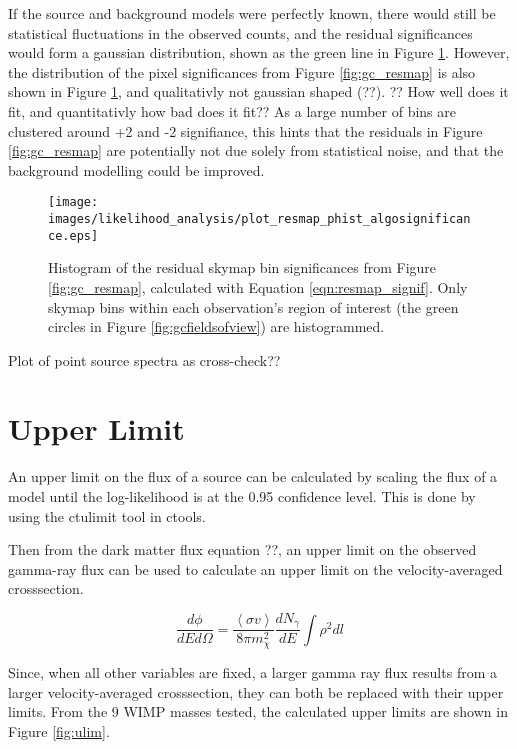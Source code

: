   If the source and background models were perfectly known, there would still be statistical fluctuations in the observed counts, and the residual significances would form a gaussian distribution, shown as the green line in Figure \ref{fig:gc_resmap_sighist}.
  However, the distribution of the pixel significances from Figure \ref{fig:gc_resmap} is also shown in Figure \ref{fig:gc_resmap_sighist}, and qualitativly not gaussian shaped {\color{red}(??)}.
  {\color{red}?? How well does it fit, and quantitativly how bad does it fit??}
  As a large number of bins are clustered around +2 and -2 signifiance, this hints that the residuals in Figure \ref{fig:gc_resmap} are potentially not due solely from statistical noise, and that the background modelling could be improved.
  
  \begin{figure}[ht]
    \centering
    \texttt{[image: images/likelihood\_analysis/plot\_resmap\_phist\_algosignificance.eps]}
    \caption[Galactic Center Residual Histogram]
    {
      Histogram of the residual skymap bin significances from Figure \ref{fig:gc_resmap}, calculated with Equation \ref{eqn:resmap_signif}.
      Only skymap bins within each observation's region of interest (the green circles in Figure \ref{fig:gcfieldsofview}) are histogrammed.
    }
    \label{fig:gc_resmap_sighist}
  \end{figure}

  {\color{red}Plot of point source spectra as cross-check??}
  
\section{Upper Limit}
  An upper limit on the flux of a source can be calculated by scaling the flux of a model until the log-likelihood is at the 0.95 confidence level.
  This is done by using the ctulimit tool in ctools.
  
  Then from the dark matter flux {\color{red}equation ??}, an upper limit on the observed gamma-ray flux can be used to calculate an upper limit on the velocity-averaged crosssection.
  
  \begin{equation}\label{eqn:ulim}
    \frac{d\phi}{dE d\Omega} = \frac{ \left \langle \sigma v \right \rangle }{8\pi m_{\chi}^{2}} \frac{dN_{\gamma}}{dE} \int \rho^{2} dl
  \end{equation}
  
  Since, when all other variables are fixed, a larger gamma ray flux results from a larger velocity-averaged crosssection, they can both be replaced with their upper limits.
  From the 9 WIMP masses tested, the calculated upper limits are shown in Figure \ref{fig:ulim}.

